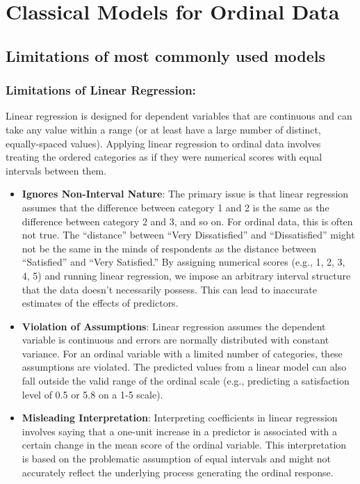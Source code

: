 \documentclass[
  letterpaper,
  DIV=11,
  numbers=noendperiod]{scrartcl}
\begin{document}
\hypertarget{classical-models-for-ordinal-data}{%
\section{Classical Models for Ordinal
Data}\label{classical-models-for-ordinal-data}}

\hypertarget{limitations-of-most-commonly-used-models}{%
\subsection{Limitations of most commonly used
models}\label{limitations-of-most-commonly-used-models}}

\hypertarget{limitations-of-linear-regression}{%
\subsubsection*{Limitations of Linear
Regression:}\label{limitations-of-linear-regression}}

Linear regression is designed for dependent variables that are
continuous and can take any value within a range (or at least have a
large number of distinct, equally-spaced values). Applying linear
regression to ordinal data involves treating the ordered categories as
if they were numerical scores with equal intervals between them.

\begin{itemize}
\item
  \textbf{Ignores Non-Interval Nature}: The primary issue is that linear
  regression assumes that the difference between category 1 and 2 is the
  same as the difference between category 2 and 3, and so on. For
  ordinal data, this is often not true. The ``distance'' between ``Very
  Dissatisfied'' and ``Dissatisfied'' might not be the same in the minds
  of respondents as the distance between ``Satisfied'' and ``Very
  Satisfied.'' By assigning numerical scores (e.g., 1, 2, 3, 4, 5) and
  running linear regression, we impose an arbitrary interval structure
  that the data doesn't necessarily possess. This can lead to inaccurate
  estimates of the effects of predictors.
\item
  \textbf{Violation of Assumptions}: Linear regression assumes the
  dependent variable is continuous and errors are normally distributed
  with constant variance. For an ordinal variable with a limited number
  of categories, these assumptions are violated. The predicted values
  from a linear model can also fall outside the valid range of the
  ordinal scale (e.g., predicting a satisfaction level of 0.5 or 5.8 on
  a 1-5 scale).
\item
  \textbf{Misleading Interpretation}: Interpreting coefficients in
  linear regression involves saying that a one-unit increase in a
  predictor is associated with a certain change in the mean score of the
  ordinal variable. This interpretation is based on the problematic
  assumption of equal intervals and might not accurately reflect the
  underlying process generating the ordinal response.
\end{itemize}
\end{document}
